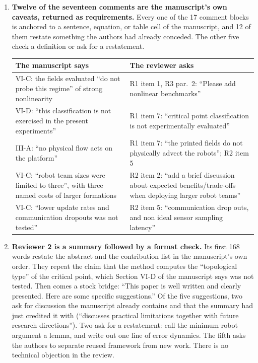 \documentclass[11pt,letterpaper]{article}
\newcommand{\q}[1]{``#1''}
\newcommand{\lead}[1]{\textbf{#1}}
\begin{document}
\begin{enumerate}[resume]
\item \lead{Twelve of the seventeen comments are the manuscript's own caveats, returned as requirements.} Every one of the 17 comment blocks is anchored to a sentence, equation, or table cell of the manuscript, and 12 of them restate something the authors had already conceded. The other five check a definition or ask for a restatement.\par
\vspace{2pt}
{\footnotesize\renewcommand{\arraystretch}{1.12}
\begin{tabularx}{\linewidth}{@{}>{\RaggedRight\arraybackslash}X>{\RaggedRight\arraybackslash}X@{}}
\toprule
\textbf{The manuscript says} & \textbf{The reviewer asks} \\
\midrule
VI-C: the fields evaluated \q{do not probe this regime} of strong nonlinearity & R1 item 1, R3 par.~2: \q{Please add nonlinear benchmarks} \\
VI-D: \q{this classification is not exercised in the present experiments} & R1 item 7: \q{critical point classification is not experimentally evaluated} \\
III-A: \q{no physical flow acts on the platform} & R1 item 7: \q{the printed fields do not physically advect the robots}; R2 item 5 \\
VI-C: \q{robot team sizes were limited to three}, with three named costs of larger formations & R2 item 2: \q{add a brief discussion about expected benefits/trade-offs when deploying larger robot teams} \\
VI-C: \q{lower update rates and communication dropouts was not tested} & R2 item 5: \q{communication drop outs, and non ideal sensor sampling latency} \\
\bottomrule
\end{tabularx}}

\item \lead{Reviewer 2 is a summary followed by a format check.} Its first 168 words restate the abstract and the contribution list in the manuscript's own order. They repeat the claim that the method computes the \q{topological type} of the critical point, which Section VI-D of the manuscript says was not tested. Then comes a stock bridge: \q{This paper is well written and clearly presented. Here are some specific suggestions.} Of the five suggestions, two ask for discussion the manuscript already contains and that the summary had just credited it with (\q{discusses practical limitations together with future research directions}). Two ask for a restatement: call the minimum-robot argument a lemma, and write out one line of error dynamics. The fifth asks the authors to separate reused framework from new work. There is no technical objection in the review.


\end{enumerate}
\end{document}
